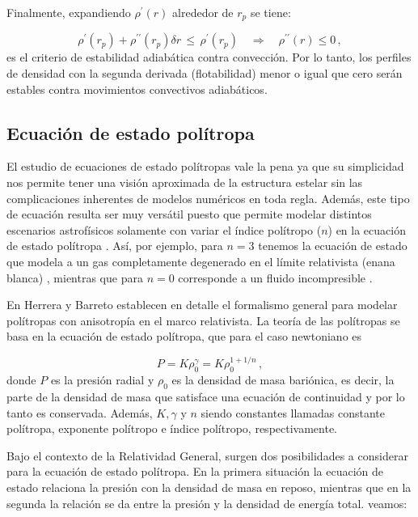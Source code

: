 \documentclass[letterpaper,11pt]{article}
\begin{document}
Finalmente, expandiendo $\rho^{\prime}(r)$ alrededor de $r_{p}$ se tiene:

\begin{equation*}
    \rho^{\prime}(r_{p}) + \rho^{\prime \prime} (r_{p}) \delta r \, \leq \, \rho^{\prime}(r_{p}) \quad \Rightarrow \quad \rho^{\prime \prime} (r) \leq 0 \, ,
\end{equation*}
es el criterio de estabilidad adiabática contra convección. Por lo tanto, los perfiles de densidad con la segunda derivada (flotabilidad) menor o igual que cero serán estables contra movimientos convectivos adiabáticos.

\subsection{Ecuación de estado polítropa}

El estudio de ecuaciones de estado polítropas vale la pena ya que su simplicidad nos permite tener una visión aproximada de la estructura estelar sin las complicaciones inherentes de modelos numéricos en toda regla. Además, este tipo de ecuación resulta ser muy versátil puesto que permite modelar distintos escenarios astrofísicos solamente con variar el índice polítropo ($n$) en la ecuación de estado polítropa \cite{Tooper1964b}. Así, por ejemplo, para $n=3$ tenemos la ecuación de estado que modela a un gas completamente degenerado en el límite relativista (enana blanca) \cite{araujo2011newtonian}, mientras que para $n = 0$ corresponde a un fluido incompresible \cite{nilsson2000general}. 

En \cite{herrera2013general} Herrera y Barreto establecen en detalle el formalismo general para modelar polítropas con anisotropía en el marco relativista. La teoría de las polítropas se basa en la ecuación de estado polítropa, que para el caso newtoniano es

\begin{equation}
\label{Poli1}
    P = K \rho_{0}^{\gamma} = K \rho_{0}^{1+1/n} \, ,
\end{equation}
donde $P$ es la presión radial y $\rho_{0}$ es la densidad de masa bariónica, es decir, la parte de la densidad de masa que satisface una ecuación de continuidad y por lo tanto es conservada. Además, $K, \gamma$ y $n$ siendo constantes llamadas constante polítropa, exponente polítropo e índice polítropo, respectivamente.

Bajo el contexto de la Relatividad General, surgen dos posibilidades a considerar para la ecuación de estado polítropa. En la primera situación la ecuación de estado relaciona la presión con la densidad de masa en reposo, mientras que en la segunda la relación se da entre la presión y la densidad de energía total. veamos:
\end{document}

